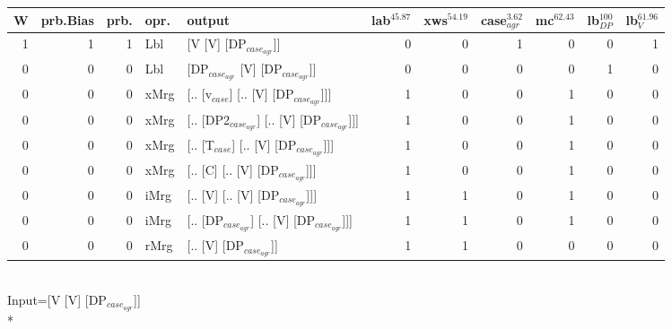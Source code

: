 \begin{tabularx}{\linewidth}{rrrlXrrrrrr}
\hline
   W &   prb.Bias &   prb. & opr.   & output                                     &   lab$^{45.87}$ &   xws$^{54.19}$ &   case$_{agr}^{3.62}$ &   mc$^{62.43}$ &   lb$_{DP}^{100}$ &   lb$_{V}^{61.96}$ \\
\hline
   1 &       1 &   1 & Lbl  & [V [V] [DP$_{case_{agr}}$]]                      &             0 &             0 &                  1 &            0 &                0 &              1 \\
   0 &       0 &   0 & Lbl  & [DP$_{case_{agr}}$ [V] [DP$_{case_{agr}}$]]            &             0 &             0 &                  0 &            0 &                1 &              0 \\
   0 &       0 &   0 & xMrg & [.. [v$_{case}$] [.. [V] [DP$_{case_{agr}}$]]]       &             1 &             0 &                  0 &            1 &                0 &              0 \\
   0 &       0 &   0 & xMrg & [.. [DP2$_{case_{agr}}$] [.. [V] [DP$_{case_{agr}}$]]] &             1 &             0 &                  0 &            1 &                0 &              0 \\
   0 &       0 &   0 & xMrg & [.. [T$_{case}$] [.. [V] [DP$_{case_{agr}}$]]]       &             1 &             0 &                  0 &            1 &                0 &              0 \\
   0 &       0 &   0 & xMrg & [.. [C] [.. [V] [DP$_{case_{agr}}$]]]            &             1 &             0 &                  0 &            1 &                0 &              0 \\
   0 &       0 &   0 & iMrg & [.. [V] [.. [V] [DP$_{case_{agr}}$]]]            &             1 &             1 &                  0 &            1 &                0 &              0 \\
   0 &       0 &   0 & iMrg & [.. [DP$_{case_{agr}}$] [.. [V] [DP$_{case_{agr}}$]]]  &             1 &             1 &                  0 &            1 &                0 &              0 \\
   0 &       0 &   0 & rMrg & [.. [V] [DP$_{case_{agr}}$]]                     &             1 &             1 &                  0 &            0 &                0 &              0 \\
\hline
\end{tabularx}\endgroup\\
\begingroup\scriptsize Input=[V [V] [DP$_{case_{agr}}$]]\\*
